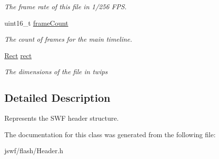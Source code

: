 \begin{DoxyCompactItemize}
\begin{DoxyCompactList}\small\item\em The frame rate of this file in 1/256 F\+P\+S. \end{DoxyCompactList}\item 
\hypertarget{classjswf_1_1flash_1_1_header_ab687d679b8c9f543571913b98a0f6795}{uint16\+\_\+t \hyperlink{classjswf_1_1flash_1_1_header_ab687d679b8c9f543571913b98a0f6795}{frame\+Count}}\label{classjswf_1_1flash_1_1_header_ab687d679b8c9f543571913b98a0f6795}

\begin{DoxyCompactList}\small\item\em The count of frames for the main timeline. \end{DoxyCompactList}\item 
\hypertarget{classjswf_1_1flash_1_1_header_a458a074681b52632fe31faa33b760773}{\hyperlink{structjswf_1_1flash_1_1_rect}{Rect} \hyperlink{classjswf_1_1flash_1_1_header_a458a074681b52632fe31faa33b760773}{rect}}\label{classjswf_1_1flash_1_1_header_a458a074681b52632fe31faa33b760773}

\begin{DoxyCompactList}\small\item\em The dimensions of the file in {\ttfamily twips} \end{DoxyCompactList}\end{DoxyCompactItemize}


\subsection{Detailed Description}
Represents the {\ttfamily S\+W\+F header} structure. 

The documentation for this class was generated from the following file\+:\begin{DoxyCompactItemize}
\item 
jswf/flash/Header.\+h\end{DoxyCompactItemize}
